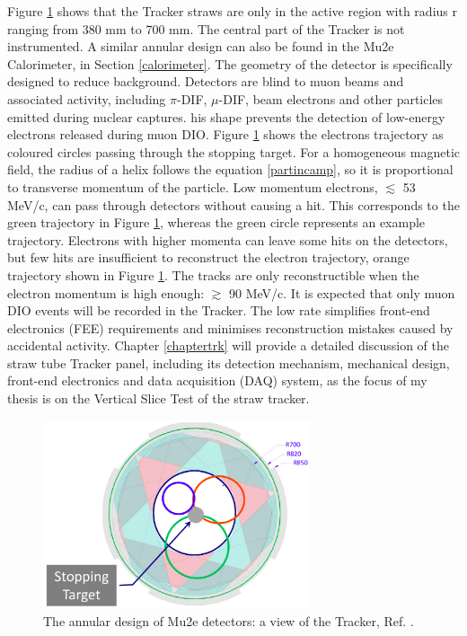 Figure \ref{fig:sttrk} shows that the Tracker straws are only in the active region with radius r ranging from 380 mm to 700 mm. The central part of the Tracker is not instrumented. A similar annular design can also be found in the Mu2e Calorimeter, in Section \ref{calorimeter}. The geometry of the detector is specifically designed to reduce background. Detectors are blind to muon beams and associated activity, including $\pi$-DIF, $\mu$-DIF, beam electrons and other particles emitted during nuclear captures. his shape prevents the detection of low-energy electrons released during muon DIO. Figure \ref{fig:sttrk} shows the electrons trajectory as coloured circles passing through the stopping target. For a homogeneous magnetic field, the radius of a helix follows the equation \ref{partincamp}, so it is proportional to transverse momentum of the particle. Low momentum electrons, $\lesssim$ 53 MeV/c, can pass through detectors without causing a hit. This corresponds to the green trajectory in Figure \ref{fig:sttrk}, whereas the green circle represents an example trajectory. Electrons with higher momenta can leave some hits on the detectors, but few hits are insufficient to reconstruct the electron trajectory, orange trajectory shown in Figure \ref{fig:sttrk}. The tracks are only reconstructible when the electron momentum is high enough: $\gtrsim$ 90 MeV/c. It is expected that only muon DIO events will be recorded in the Tracker. The low rate simplifies front-end electronics (FEE) requirements and minimises reconstruction mistakes caused by accidental activity. Chapter \ref{chaptertrk} will provide a detailed discussion of the straw tube Tracker panel, including its detection mechanism, mechanical design, front-end electronics and data acquisition (DAQ) system, as the focus of my thesis is on the Vertical Slice Test of the straw tracker.
\begin{figure}[!h]
\centering
\includegraphics[width =0.7\textwidth]{images/chapter2/Screenshot_20240306_214911.png}
\caption{The annular design of Mu2e detectors: a view of the Tracker, Ref. \cite{trk}.}
\label{fig:sttrk}
\end{figure}
